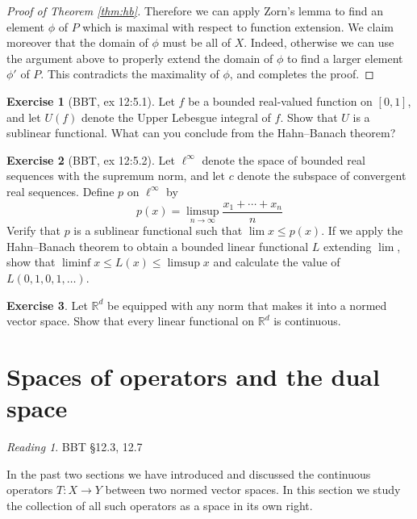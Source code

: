 \documentclass[11pt,oneside]{amsbook}
\newcommand{\RR}{{\mathbb R}}
\theoremstyle{definition}
\newtheorem{exerc}{Exercise}[section]
\theoremstyle{plain}
\theoremstyle{definition}
\theoremstyle{remark}
\newtheorem*{reading}{Reading}
\numberwithin{equation}{section}
\numberwithin{figure}{section}
\begin{document}
\begin{proof}[Proof of Theorem \ref{thm:hb}]
  Therefore we can apply Zorn's lemma to find an element $\phi$ of $P$ which is maximal with respect to function extension. We claim moreover that the domain of $\phi$ must be all of $X$. Indeed, otherwise we can use the argument above to properly extend the domain of $\phi$ to find a larger element $\phi'$ of $P$. This contradicts the maximality of $\phi$, and completes the proof.
\end{proof}

\begin{exerc}[BBT, ex 12:5.1]
  Let $f$ be a bounded real-valued function on $[0,1]$, and let $U(f)$ denote the Upper Lebesgue integral of $f$. Show that $U$ is a sublinear functional. What can you conclude from the Hahn--Banach theorem?
\end{exerc}

\begin{exerc}[BBT, ex 12:5.2]
  Let $\ell^\infty$ denote the space of bounded real sequences with the supremum norm, and let $c$ denote the subspace of convergent real sequences. Define $p$ on $\ell^\infty$ by
  \[p(x)=\limsup_{n\to\infty}\frac{x_1+\cdots+x_n}{n}
  \]
  Verify that $p$ is a sublinear functional such that $\lim x\leq p(x)$. If we apply the Hahn--Banach theorem to obtain a bounded linear functional $L$ extending $\lim$, show that $\liminf x\leq L(x)\leq\limsup x$ and calculate the value of $L(0,1,0,1,\ldots)$.
\end{exerc}

\begin{exerc}
  Let $\RR^d$ be equipped with any norm that makes it into a normed vector space. Show that every linear functional on $\RR^d$ is continuous.
\end{exerc}

\newpage
\section{Spaces of operators and the dual space}

\begin{reading}
  BBT \S 12.3, 12.7
\end{reading}

In the past two sections we have introduced and discussed the continuous operators $T\colon X\to Y$ between two normed vector spaces. In this section we study the collection of all such operators as a space in its own right.
\end{document}
